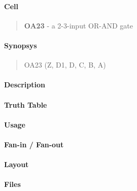 \label{OA23}
\paragraph{Cell}
\begin{quote}
    \textbf{OA23} - a 2-3-input OR-AND gate
\end{quote}

\paragraph{Synopsys}
\begin{quote}
    OA23 (Z, D1, D, C, B, A)
\end{quote}

\paragraph{Description}

%

\paragraph{Truth Table}
%

\paragraph{Usage}

\paragraph{Fan-in / Fan-out}

\paragraph{Layout}

\paragraph{Files}
